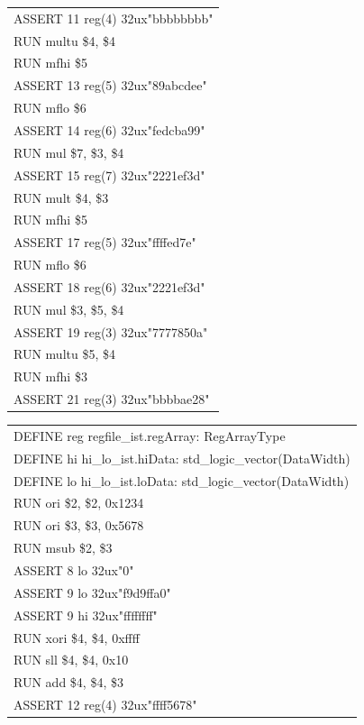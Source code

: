 \documentclass[11pt,utf8]{article}
\begin{document}
{{{\begin{center}
\begin{longtable}{p{15cm}}
		ASSERT{ }11{ }reg(4){ }32ux"bbbbbbbb"\\
		RUN{ }multu{ }\$4,{ }\$4\\
		RUN{ }mfhi{ }\$5\\
		ASSERT{ }13{ }reg(5){ }32ux"89abcdee"\\
		RUN{ }mflo{ }\$6\\
		ASSERT{ }14{ }reg(6){ }32ux"fedcba99"\\
		RUN{ }mul{ }\$7,{ }\$3,{ }\$4\\
		ASSERT{ }15{ }reg(7){ }32ux"2221ef3d"\\
		RUN{ }mult{ }\$4,{ }\$3\\
		RUN{ }mfhi{ }\$5\\
		ASSERT{ }17{ }reg(5){ }32ux"ffffed7e"\\
		RUN{ }mflo{ }\$6\\
		ASSERT{ }18{ }reg(6){ }32ux"2221ef3d"\\
		RUN{ }mul{ }\$3,{ }\$5,{ }\$4\\
		ASSERT{ }19{ }reg(3){ }32ux"7777850a"\\
		RUN{ }multu{ }\$5,{ }\$4\\
		RUN{ }mfhi{ }\$3\\
		ASSERT{ }21{ }reg(3){ }32ux"bbbbae28"\\
		\hline \end{longtable} \end{center}
\begin{center}	\begin{longtable}{p{15cm}} \hline
		DEFINE{ }reg{ }regfile\_ist.regArray:{ }RegArrayType\\
		DEFINE{ }hi{ }hi\_lo\_ist.hiData:{ }std\_logic\_vector(DataWidth)\\
		DEFINE{ }lo{ }hi\_lo\_ist.loData:{ }std\_logic\_vector(DataWidth)\\
		RUN{ }ori{ }\$2,{ }\$2,{ }0x1234\\
		RUN{ }ori{ }\$3,{ }\$3,{ }0x5678\\
		RUN{ }msub{ }\$2,{ }\$3\\
		ASSERT{ }8{ }lo{ }32ux"0"\\
		ASSERT{ }9{ }lo{ }32ux"f9d9ffa0"\\
		ASSERT{ }9{ }hi{ }32ux"ffffffff"\\
		RUN{ }xori{ }\$4,{ }\$4,{ }0xffff\\
		RUN{ }sll{ }\$4,{ }\$4,{ }0x10\\
		RUN{ }add{ }\$4,{ }\$4,{ }\$3\\
		ASSERT{ }12{ }reg(4){ }32ux"ffff5678"\\

\end{longtable}
\end{center}}}}
\end{document}
